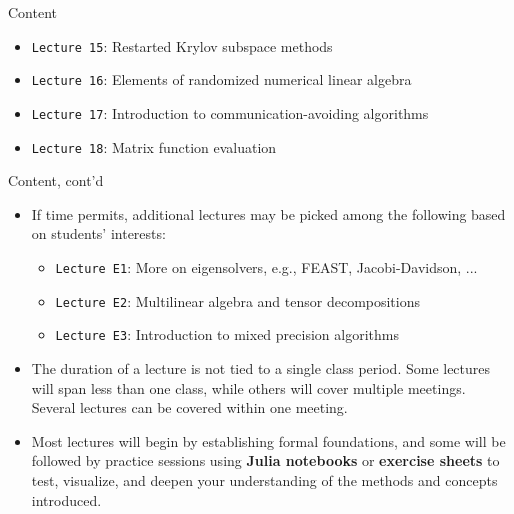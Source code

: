 \documentclass[t,usepdftitle=false]{beamer}
\begin{document}
\begin{frame}{Content}
\begin{itemize}
\begin{itemize}
\item[-] \texttt{Lecture 15}: Restarted Krylov subspace methods\vspace{.02cm}
\item[-] \texttt{Lecture 16}: Elements of randomized numerical linear algebra\vspace{.02cm}
\item[-] \texttt{Lecture 17}: Introduction to communication-avoiding algorithms\vspace{.02cm}
\item[-] \texttt{Lecture 18}: Matrix function evaluation
\end{itemize}
\end{itemize}
\end{frame}

\begin{frame}{Content, cont'd}
\begin{itemize}
\item If time permits, additional lectures may be picked among the following based on students' interests:
\begin{itemize}
\item[-] \texttt{Lecture E1}: More on eigensolvers, e.g., FEAST, Jacobi-Davidson, ...\vspace{.04cm}
\item[-] \texttt{Lecture E2}: Multilinear algebra and tensor decompositions\vspace{.04cm}
\item[-] \texttt{Lecture E3}: Introduction to mixed precision algorithms
\end{itemize}
\item The duration of a lecture is not tied to a single class period.
Some lectures will span less than one class, while others will cover multiple meetings.
Several lectures can be covered within one meeting.
\item Most lectures will begin by establishing formal foundations, and some will be followed by practice sessions using \textbf{Julia notebooks} or \textbf{exercise sheets} to test, visualize, and deepen your understanding of the methods and concepts introduced.
\end{itemize}
\end{frame}
\end{document}
